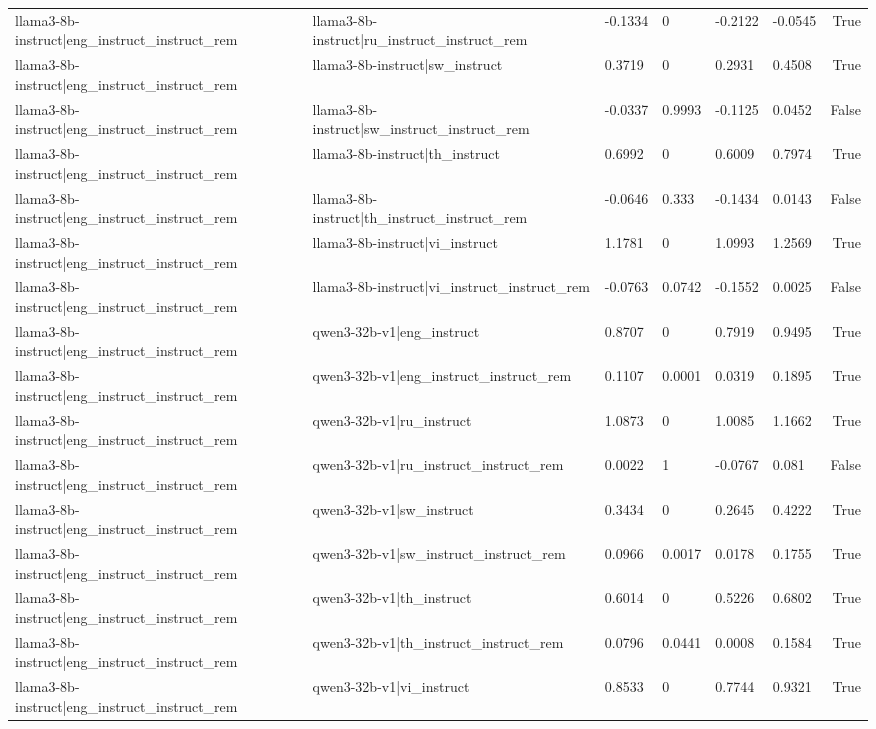 \begin{table}
\begin{tabular}{llllllr}
llama3-8b-instruct|eng_instruct_instruct_rem & llama3-8b-instruct|ru_instruct_instruct_rem & -0.1334 & 0 & -0.2122 & -0.0545 & True \\
llama3-8b-instruct|eng_instruct_instruct_rem & llama3-8b-instruct|sw_instruct & 0.3719 & 0 & 0.2931 & 0.4508 & True \\
llama3-8b-instruct|eng_instruct_instruct_rem & llama3-8b-instruct|sw_instruct_instruct_rem & -0.0337 & 0.9993 & -0.1125 & 0.0452 & False \\
llama3-8b-instruct|eng_instruct_instruct_rem & llama3-8b-instruct|th_instruct & 0.6992 & 0 & 0.6009 & 0.7974 & True \\
llama3-8b-instruct|eng_instruct_instruct_rem & llama3-8b-instruct|th_instruct_instruct_rem & -0.0646 & 0.333 & -0.1434 & 0.0143 & False \\
llama3-8b-instruct|eng_instruct_instruct_rem & llama3-8b-instruct|vi_instruct & 1.1781 & 0 & 1.0993 & 1.2569 & True \\
llama3-8b-instruct|eng_instruct_instruct_rem & llama3-8b-instruct|vi_instruct_instruct_rem & -0.0763 & 0.0742 & -0.1552 & 0.0025 & False \\
llama3-8b-instruct|eng_instruct_instruct_rem & qwen3-32b-v1|eng_instruct & 0.8707 & 0 & 0.7919 & 0.9495 & True \\
llama3-8b-instruct|eng_instruct_instruct_rem & qwen3-32b-v1|eng_instruct_instruct_rem & 0.1107 & 0.0001 & 0.0319 & 0.1895 & True \\
llama3-8b-instruct|eng_instruct_instruct_rem & qwen3-32b-v1|ru_instruct & 1.0873 & 0 & 1.0085 & 1.1662 & True \\
llama3-8b-instruct|eng_instruct_instruct_rem & qwen3-32b-v1|ru_instruct_instruct_rem & 0.0022 & 1 & -0.0767 & 0.081 & False \\
llama3-8b-instruct|eng_instruct_instruct_rem & qwen3-32b-v1|sw_instruct & 0.3434 & 0 & 0.2645 & 0.4222 & True \\
llama3-8b-instruct|eng_instruct_instruct_rem & qwen3-32b-v1|sw_instruct_instruct_rem & 0.0966 & 0.0017 & 0.0178 & 0.1755 & True \\
llama3-8b-instruct|eng_instruct_instruct_rem & qwen3-32b-v1|th_instruct & 0.6014 & 0 & 0.5226 & 0.6802 & True \\
llama3-8b-instruct|eng_instruct_instruct_rem & qwen3-32b-v1|th_instruct_instruct_rem & 0.0796 & 0.0441 & 0.0008 & 0.1584 & True \\
llama3-8b-instruct|eng_instruct_instruct_rem & qwen3-32b-v1|vi_instruct & 0.8533 & 0 & 0.7744 & 0.9321 & True \\

\end{tabular}
\end{table}
